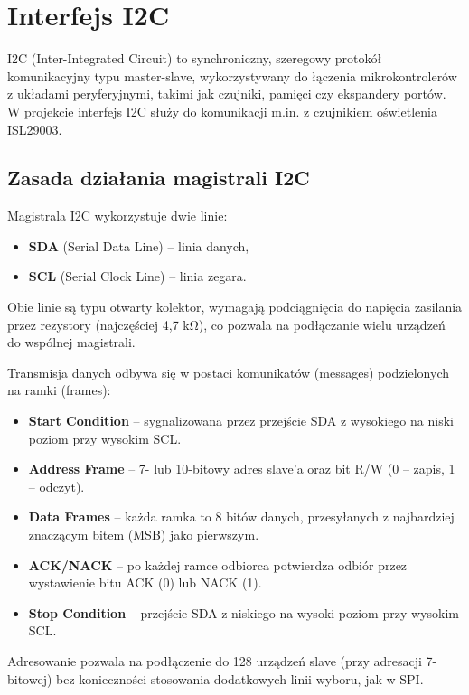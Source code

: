 \documentclass[a4paper,12pt]{report}
\begin{document}
\section{Interfejs I2C}

I2C (Inter-Integrated Circuit) to synchroniczny, szeregowy protokół komunikacyjny typu master-slave, wykorzystywany do łączenia mikrokontrolerów z układami peryferyjnymi, takimi jak czujniki, pamięci czy ekspandery portów. W projekcie interfejs I2C służy do komunikacji m.in. z czujnikiem oświetlenia ISL29003.

\subsection{Zasada działania magistrali I2C}

Magistrala I2C wykorzystuje dwie linie:
\begin{itemize}
    \item \textbf{SDA} (Serial Data Line) – linia danych,
    \item \textbf{SCL} (Serial Clock Line) – linia zegara.
\end{itemize}
Obie linie są typu otwarty kolektor, wymagają podciągnięcia do napięcia zasilania przez rezystory (najczęściej 4,7 k\si{\ohm}), co pozwala na podłączanie wielu urządzeń do wspólnej magistrali.

Transmisja danych odbywa się w postaci komunikatów (messages) podzielonych na ramki (frames):
\begin{itemize}
    \item \textbf{Start Condition} – sygnalizowana przez przejście SDA z wysokiego na niski poziom przy wysokim SCL.
    \item \textbf{Address Frame} – 7- lub 10-bitowy adres slave’a oraz bit R/W (0 – zapis, 1 – odczyt).
    \item \textbf{Data Frames} – każda ramka to 8 bitów danych, przesyłanych z najbardziej znaczącym bitem (MSB) jako pierwszym.
    \item \textbf{ACK/NACK} – po każdej ramce odbiorca potwierdza odbiór przez wystawienie bitu ACK (0) lub NACK (1).
    \item \textbf{Stop Condition} – przejście SDA z niskiego na wysoki poziom przy wysokim SCL.
\end{itemize}

Adresowanie pozwala na podłączenie do 128 urządzeń slave (przy adresacji 7-bitowej) bez konieczności stosowania dodatkowych linii wyboru, jak w SPI.
\end{document}
